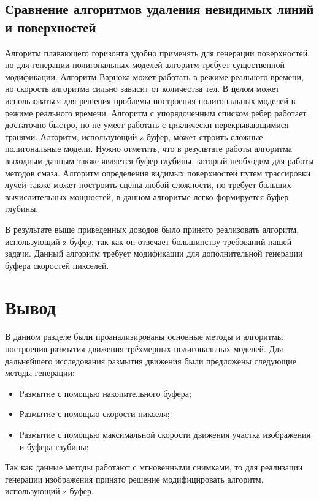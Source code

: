\subsection{Сравнение алгоритмов удаления невидимых линий и поверхностей}

Алгоритм плавающего горизонта удобно применять для генерации поверхностей, но для генерации полигональных моделей алгоритм требует существенной модификации.
Алгоритм Варнока может работать в режиме реального времени, но скорость алгоритма сильно зависит от количества тел. В целом может использоваться для решения проблемы построения полигональных моделей в режиме реального времени.
Алгоритм с упорядоченным списком ребер работает достаточно быстро, но не умеет работать с циклически перекрывающимися гранями.
Алгоритм, использующий z-буфер, может строить сложные полигональные модели. Нужно отметить, что в результате работы алгоритма выходным данным также является буфер глубины, который необходим для работы методов смаза.
Алгоритм определения видимых поверхностей путем трассировки лучей также может построить сцены любой сложности, но требует больших вычислительных мощностей, в данном алгоритме легко формируется буфер глубины.
\par
В результате выше приведенных доводов было принято реализовать алгоритм, использующий z-буфер, так как он отвечает большинству требований нашей задачи. Данный алгоритм требует модификации для дополнительной генерации буфера скоростей пикселей.


\section{Вывод}

В данном разделе были проанализированы основные методы и алгоритмы построения размытия движения  трёхмерных полигональных моделей. Для дальнейшего исследования размытия движения были предложены следующие методы генерации:
\begin{itemize}
    \item Размытие с помощью накопительного буфера; 
    \item Размытие с помощью скорости пикселя; 
    \item Размытие с помощью максимальной скорости движения участка изображения и буфера глубины; 
\end{itemize}
\par
Так как данные методы работают с мгновенными снимками, то для реализации генерации изображения принято решение модифицировать алгоритм, использующий z-буфер. 

